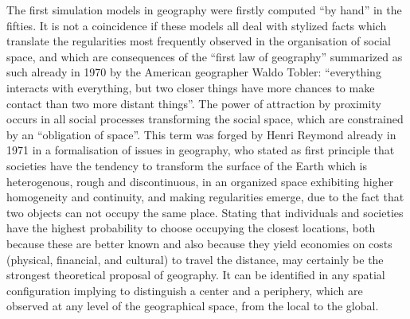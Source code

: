 \documentclass[10pt]{article}
\begin{document}
The first simulation models in geography were firstly computed ``by hand'' in the fifties. It is not a coincidence if these models all deal with stylized facts which translate the regularities most frequently observed in the organisation of social space, and which are consequences of the ``first law of geography'' summarized as such already in 1970 by the American geographer Waldo Tobler: ``everything interacts with everything, but two closer things have more chances to make contact than two more distant things''. The power of attraction by proximity occurs in all social processes transforming the social space, which are constrained by an ``obligation of space''. This term was forged by Henri Reymond already in 1971 in a formalisation of issues in geography, who stated as first principle that societies have the tendency to transform the surface of the Earth which is heterogenous, rough and discontinuous, in an organized space exhibiting higher homogeneity and continuity, and making regularities emerge, due to the fact that two objects can not occupy the same place. Stating that individuals and societies have the highest probability to choose occupying the closest locations, both because these are better known and also because they yield economies on costs (physical, financial, and cultural) to travel the distance, may certainly be the strongest theoretical proposal of geography. It can be identified in any spatial configuration implying to distinguish a center and a periphery, which are observed at any level of the geographical space, from the local to the global. 
\end{document}
